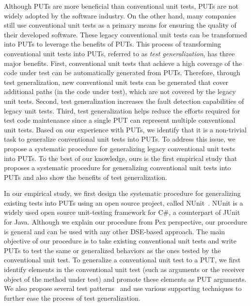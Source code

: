 Although PUTs are more beneficial than conventional unit tests, PUTs are not widely adopted by the software industry. On the other hand, many companies still use conventional unit tests as a primary means for ensuring the quality of their developed software. These legacy conventional unit tests can be transformed into PUTs to leverage the benefits of PUTs. This process of transforming conventional unit tests into PUTs, referred to as \emph{test generalization}, has three major benefits. First, conventional unit tests that achieve a high coverage of the code under test can be automatically generated from PUTs. Therefore, through test generalization, new conventional unit tests can be generated that cover additional paths (in the code under test), which are not covered by the legacy unit tests. Second, test generalization increases the fault detection capabilities of legacy unit tests. Third, test generalization helps reduce the efforts required for test code maintenance since a single PUT can represent multiple conventional unit tests.
Based on our experience with PUTs, we identify that it is a non-trivial task to generalize conventional unit tests into PUTs. To address this issue, we propose
a systematic procedure for generalizing legacy conventional unit tests into PUTs. To the best of our knowledge, ours is the first empirical study that proposes a systematic procedure for generalizing conventional unit tests into PUTs and also show the benefits of test generalization.

In our empirical study, we first design the systematic procedure for generalizing existing tests into PUTs using an open source project, called NUnit~\cite{nunit}. NUnit is a widely used open source unit-testing framework for C\#, a counterpart of JUnit~\cite{JUnit} for Java. Although we explain our procedure from Pex perspective, our procedure is general and can be used with any other DSE-based approach. The main objective of our procedure is to take existing conventional unit tests and write PUTs to test the same or generalized behaviors as the ones tested by the conventional unit test. To generalize a conventional unit test to a PUT, we first identify elements in the conventional unit test (such as arguments or the receiver object of the method under test) and promote these elements as PUT arguments. We also propose several test patterns~\cite{halleux08:putpatterns} and use various supporting techniques to further ease the process of test generalization. 


